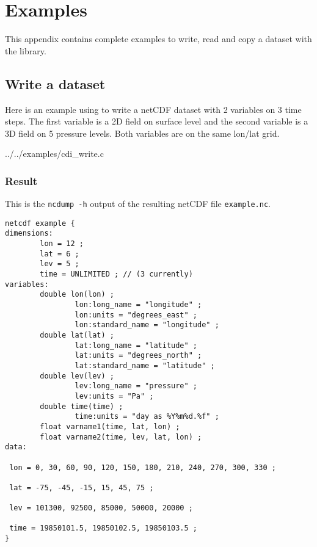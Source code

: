 
\chapter{\label{example}Examples}

This appendix contains complete examples to write, read
and copy a dataset with the {\CDI} library.


\section{\label{example_write}Write a dataset}

Here is an example using {\CDI} to write a netCDF dataset with 
2 variables on 3 time steps. The first variable is a 2D field
on surface level and the second variable is a 3D field on 5 pressure
levels. Both variables are on the same lon/lat grid. 


{../../examples/cdi_write.c}


\subsection{Result}

This is the {\tt ncdump -h} output of the resulting netCDF file {\tt example.nc}.

\begin{lstlisting}[]
netcdf example {
dimensions:
        lon = 12 ;
        lat = 6 ;
        lev = 5 ;
        time = UNLIMITED ; // (3 currently)
variables:
        double lon(lon) ;
                lon:long_name = "longitude" ;
                lon:units = "degrees_east" ;
                lon:standard_name = "longitude" ;
        double lat(lat) ;
                lat:long_name = "latitude" ;
                lat:units = "degrees_north" ;
                lat:standard_name = "latitude" ;
        double lev(lev) ;
                lev:long_name = "pressure" ;
                lev:units = "Pa" ;
        double time(time) ;
                time:units = "day as %Y%m%d.%f" ;
        float varname1(time, lat, lon) ;
        float varname2(time, lev, lat, lon) ;
data:

 lon = 0, 30, 60, 90, 120, 150, 180, 210, 240, 270, 300, 330 ;

 lat = -75, -45, -15, 15, 45, 75 ;

 lev = 101300, 92500, 85000, 50000, 20000 ;

 time = 19850101.5, 19850102.5, 19850103.5 ;
}
\end{lstlisting}


